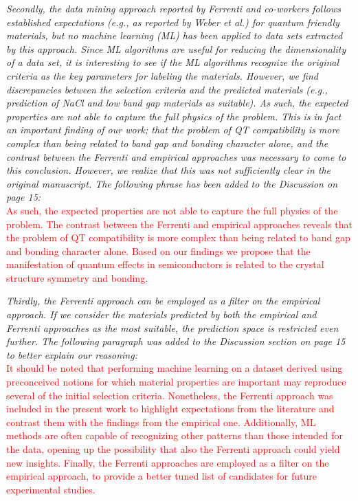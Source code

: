 \documentclass[11pt, a4paper]{letter} %
\newcommand{\mrk}[1]{\textcolor{red}{#1}}
\begin{document}
\textit{Secondly, the data mining approach reported by Ferrenti and co-workers follows established expectations (e.g., as reported by Weber et al.) for quantum friendly materials, but no machine learning (ML) has been applied to data sets extracted by this approach. Since ML algorithms are useful for reducing the dimensionality of a data set, it is interesting to see if the ML algorithms recognize the original criteria as the key parameters for labeling the materials. However, we find discrepancies between the selection criteria and the predicted materials (e.g., prediction of NaCl and low band gap materials as suitable).
As such, the expected properties are not able to capture the full physics of the problem. This is in fact an important finding of our work; that the problem of QT compatibility is more complex than being related to band gap and bonding character alone, and the contrast between the Ferrenti and empirical approaches was necessary to come to this conclusion. However, we realize that this was not sufficiently clear in the original manuscript. 
The following phrase has been added to the Discussion on page 15:} \\
\mrk{As such, the expected properties are not able to capture the full physics of the problem. The contrast between the Ferrenti and empirical approaches reveals that the problem of QT compatibility is more complex than being related to band gap and bonding character alone. Based on our findings we propose that the manifestation of quantum effects in semiconductors is related to the crystal structure symmetry and bonding. }

\textit{Thirdly, the Ferrenti approach can be employed as a filter on the empirical approach. If we consider the materials predicted by both the empirical and Ferrenti approaches as the most suitable, the prediction space is restricted even further. The following paragraph was added to the Discussion section on page 15 to better explain our reasoning:} \\ 
\mrk{It should be noted that performing machine learning on a dataset derived using preconceived notions for which material properties are important may reproduce several of the initial selection criteria. Nonetheless, the Ferrenti approach was included in the present work to highlight expectations from the literature and contrast them with the findings from the empirical one. Additionally, ML methods are often capable of recognizing other patterns than those intended for the data, opening up the possibility that also the Ferrenti approach could yield new insights. Finally, the Ferrenti approaches are employed as a filter on the empirical approach, to provide a better tuned list of candidates for future experimental studies.}
\end{document}
